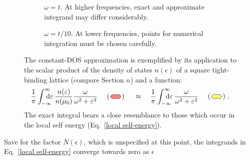 \begin{figure}[b]
    \small
    \begin{subfigure}{6.75cm}
        
        \caption{$\omega = t$. At higher frequencies, exact and approximate
                 integrand may differ considerably.}
    \end{subfigure}%
    \hfill%
    \begin{subfigure}{6.75cm}
        
        \caption{$\omega = t / 10$. At lower frequencies, points for numerical
                 integration must be chosen carefully.}
    \end{subfigure}
    \captionsetup{singlelinecheck=off}
    \caption[Constant-DOS approximation]{ %
        The constant-DOS approximation is exemplified by its application to the
        scalar product of the density of states $n(\epsilon)$ of a square
        tight-binding lattice (compare Section $n$) and a 
        function:
        \begin{align*}
            \frac 1 \pi \int \from{-\infty} \till \infty \D \epsilon \,
            \frac {n(\epsilon)}{n(\mu_0)} \frac \omega {\omega^2 + \epsilon^2}
            \quad
            \begin{tikzpicture}[baseline]
                \draw [fill=red!50, rounded corners=3pt]
                    (0, 0) rectangle (0.5, 0.2);
                \node [left=-2pt] at (0, 0.1) {(};
                \node [right=-2pt] at (0.5, 0.1) {)};
            \end{tikzpicture}
            \quad \approx \quad
            \frac 1 \pi  \int \from{-\infty} \till \infty \D \epsilon \,
            \frac \omega {\omega^2 + \epsilon^2}
            \quad
            \begin{tikzpicture}[baseline]
                \draw [fill=yellow!50, rounded corners=3pt]
                    (0, 0) rectangle (0.5, 0.2);
                \node [left=-2pt] at (0, 0.1) {(};
                \node [right=-2pt] at (0.5, 0.1) {)};
            \end{tikzpicture}.
        \end{align*}
        The exact integral bears a close resemblance to those which occur in the
        local self energy (Eq.~\ref{local self-energy}).
        }
    \label{constant-DOS approximation}
\end{figure}
%
Save for the factor $N(\epsilon)$, which is unspecified at this point, the
integrands in Eq.~\ref{local self-energy} converge towards zero as $\epsilon$
